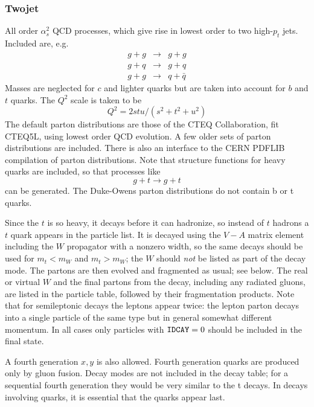 \subsubsection{Twojet} All order $\alpha_s^2$ QCD processes, which
give rise in lowest order to two high-$p_t$ jets. Included are, e.g.
\begin{eqnarray*}
g + g &\to& g + g\\
g + q &\to& g + q \\
g + g &\to& q + \bar q
\end{eqnarray*}
Masses are neglected for $c$ and lighter quarks but are taken into
account for $b$ and $t$ quarks. The $Q^2$ scale is taken to be
$$
Q^2 = 2stu/(s^2+t^2+u^2)
$$
The default parton distributions are those of the CTEQ Collaboration,
fit CTEQ5L, using lowest order QCD evolution. A few older sets of parton
distributions are included. There is also an interface to the CERN
PDFLIB compilation of parton distributions. Note that structure
functions for heavy quarks are included, so that processes like
$$
g + t \to g + t
$$
can be generated. The Duke-Owens parton distributions do not contain b
or t quarks.

      Since the $t$ is so heavy, it decays before it can hadronize, so
instead of $t$ hadrons a $t$ quark appears in the particle list. It is
decayed using the $V-A$ matrix element including the $W$ propagator
with a nonzero width, so the same decays should be used for $m_t < m_W$
and $m_t > m_W$; the $W$ should {\it not} be listed as part of the decay
mode.  The partons are then evolved and fragmented as usual; see
below. The real or virtual $W$ and the final partons from the decay,
including any radiated gluons, are listed in the particle table,
followed by their fragmentation products.  Note that for semileptonic
decays the leptons appear twice: the lepton parton decays into a
single particle of the same type but in general somewhat different
momentum. In all cases only particles with $\verb|IDCAY| = 0$ should be
included in the final state.

      A fourth generation $x,y$ is also allowed. Fourth generation
quarks are produced only by gluon fusion. Decay modes are not included
in the decay table; for a sequential fourth generation they would be
very similar to the t decays. In decays involving quarks, it is
essential that the quarks appear last.

